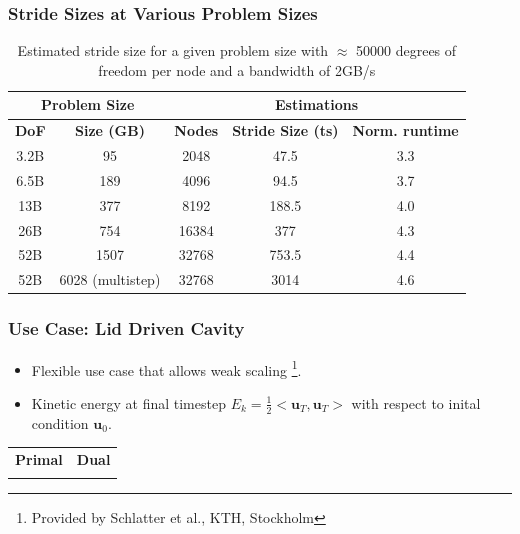 \begin{frame}
  \frametitle{Stride Sizes at Various Problem Sizes}
\begin{table}
  \centering
  \begin{tabular}{||c|c||c|c|c||}
    \hline
    \multicolumn{2}{||c||}{\bf Problem Size}&\multicolumn{3}{c||}{\bf Estimations}\\
    \hline
    {\bf DoF} & {\bf Size (GB)} & {\bf Nodes} &{\bf Stride Size
    (ts)} &{\bf Norm. runtime}\\ 
    \hline
    3.2B & 95   & 2048   & 47.5   & 3.3\\ 
    6.5B & 189  & 4096   & 94.5   & 3.7\\
    13B  & 377  & 8192   & 188.5  & 4.0\\
    26B  & 754  & 16384  & 377  & 4.3\\
    52B  & 1507 & 32768  & 753.5  & 4.4\\ 
    52B  & 6028 (multistep) & 32768  & 3014 & 4.6\\
    \hline
  \end{tabular}
  \caption{Estimated stride size for a given problem size with $\approx$ 50000
  degrees of freedom per node and a bandwidth of 2GB/s}
  \label{tab:stride}
\end{table}
\end{frame}

\begin{frame}

  \frametitle{Use Case: Lid Driven Cavity}
  \begin{itemize}
    \item Flexible use case that allows weak scaling \footnote{Provided by
      Schlatter et al., KTH,
      Stockholm}.
    \item Kinetic energy at final timestep $E_k=\frac{1}{2}<\mathbf{u}_T,
      \mathbf{u}_T>$ with respect to inital
      condition $\mathbf{u}_0$.
  \end{itemize}
  \begin{center}
    \begin{tabular}{cc}
      {\Large \bf Primal} & {\Large \bf Dual} \\
      &
      \\
    \end{tabular}
  \end{center}
\end{frame}

